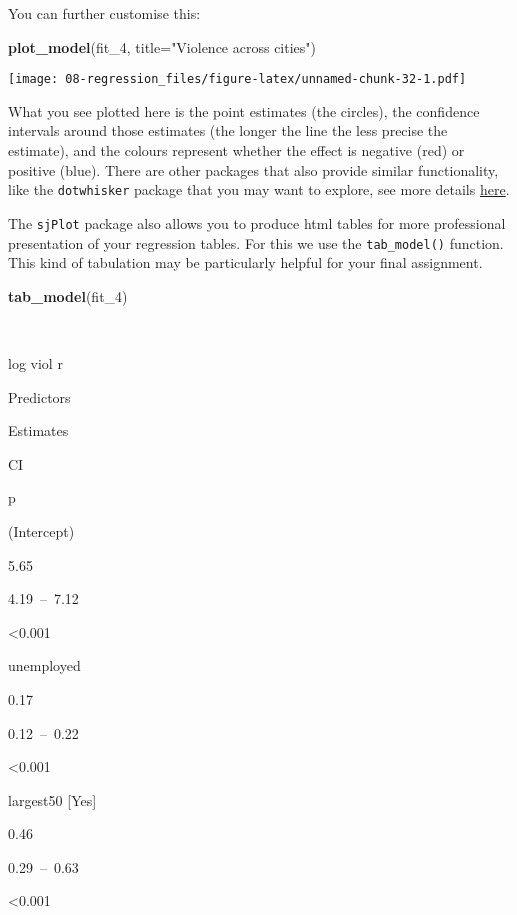 \documentclass[
]{book}
\newenvironment{Shaded}{\begin{snugshade}}{\end{snugshade}}
\newcommand{\AttributeTok}[1]{\textcolor[rgb]{0.13,0.29,0.53}{#1}}
\newcommand{\FunctionTok}[1]{\textcolor[rgb]{0.13,0.29,0.53}{\textbf{#1}}}
\newcommand{\NormalTok}[1]{#1}
\newcommand{\StringTok}[1]{\textcolor[rgb]{0.31,0.60,0.02}{#1}}
\begin{document}
You can further customise this:

\begin{Shaded}
\begin{Highlighting}[]
\FunctionTok{plot\_model}\NormalTok{(fit\_4, }\AttributeTok{title=}\StringTok{"Violence across cities"}\NormalTok{)}
\end{Highlighting}
\end{Shaded}

\texttt{[image: 08-regression\_files/figure-latex/unnamed-chunk-32-1.pdf]}

What you see plotted here is the point estimates (the circles), the confidence intervals around those estimates (the longer the line the less precise the estimate), and the colours represent whether the effect is negative (red) or positive (blue). There are other packages that also provide similar functionality, like the \texttt{dotwhisker} package that you may want to explore, see more details \href{https://cran.r-project.org/web/packages/dotwhisker/vignettes/dotwhisker-vignette.html}{here}.

The \texttt{sjPlot} package also allows you to produce html tables for more professional presentation of your regression tables. For this we use the \texttt{tab\_model()} function. This kind of tabulation may be particularly helpful for your final assignment.

\begin{Shaded}
\begin{Highlighting}[]
\FunctionTok{tab\_model}\NormalTok{(fit\_4)}
\end{Highlighting}
\end{Shaded}

~

log viol r

Predictors

Estimates

CI

p

(Intercept)

5.65

4.19~--~7.12

\textless0.001

unemployed

0.17

0.12~--~0.22

\textless0.001

largest50 {[}Yes{]}

0.46

0.29~--~0.63

\textless0.001
\end{document}
